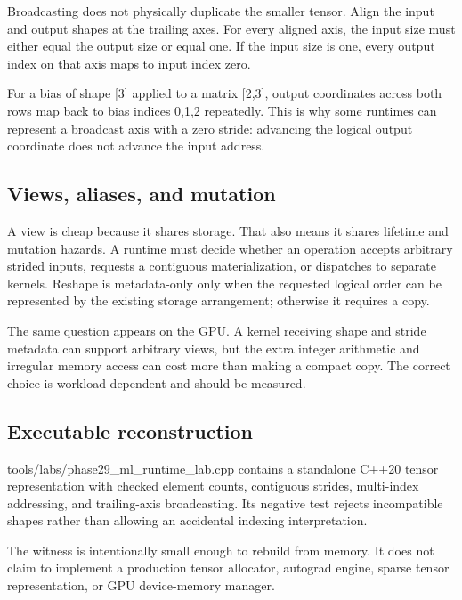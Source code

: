 Broadcasting does not physically duplicate the smaller tensor. Align the input and output shapes at the trailing axes. For every aligned axis, the input size must either equal the output size or equal one. If the input size is one, every output index on that axis maps to input index zero.

For a bias of shape {[}3{]} applied to a matrix {[}2,3{]}, output coordinates across both rows map back to bias indices 0,1,2 repeatedly. This is why some runtimes can represent a broadcast axis with a zero stride: advancing the logical output coordinate does not advance the input address.

\subsection{Views, aliases, and mutation}\label{appendix-cebadf3106d1-views-aliases-and-mutation}

A view is cheap because it shares storage. That also means it shares lifetime and mutation hazards. A runtime must decide whether an operation accepts arbitrary strided inputs, requests a contiguous materialization, or dispatches to separate kernels. Reshape is metadata-only only when the requested logical order can be represented by the existing storage arrangement; otherwise it requires a copy.

The same question appears on the GPU. A kernel receiving shape and stride metadata can support arbitrary views, but the extra integer arithmetic and irregular memory access can cost more than making a compact copy. The correct choice is workload-dependent and should be measured.

\subsection{Executable reconstruction}\label{appendix-cebadf3106d1-executable-reconstruction}

tools/labs/phase29\_ml\_runtime\_lab.cpp contains a standalone C++20 tensor representation with checked element counts, contiguous strides, multi-index addressing, and trailing-axis broadcasting. Its negative test rejects incompatible shapes rather than allowing an accidental indexing interpretation.

The witness is intentionally small enough to rebuild from memory. It does not claim to implement a production tensor allocator, autograd engine, sparse tensor representation, or GPU device-memory manager.

